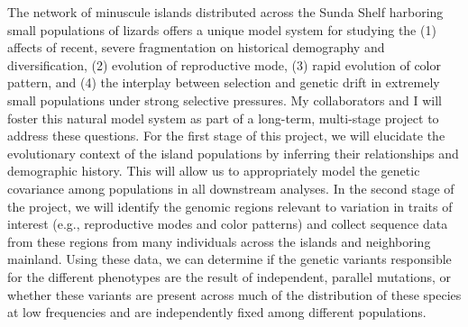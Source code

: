 The network of minuscule islands distributed across the Sunda Shelf harboring
small populations of lizards offers a unique model system for studying the 
(1) affects of recent, severe fragmentation on historical demography and
diversification,
(2) evolution of reproductive mode,
(3) rapid evolution of color pattern, and 
(4) the interplay between selection and genetic drift in extremely small
populations under strong selective pressures.
My collaborators and I will foster this natural model system as part of a
long-term, multi-stage project to address these questions.
For the first stage of this project, we will elucidate the evolutionary context
of the island populations by inferring their relationships and demographic
history.
This will allow us to appropriately model the genetic covariance among
populations in all downstream analyses.
In the second stage of the project, we will identify the genomic regions
relevant to variation in traits of interest (e.g., reproductive modes and color
patterns) and collect sequence data from these regions from many individuals
across the islands and neighboring mainland.
Using these data, we can determine if the genetic variants responsible for the
different phenotypes are the result of independent, parallel mutations, or
whether these variants are present across much of the distribution of these
species at low frequencies and are independently fixed among different
populations.
